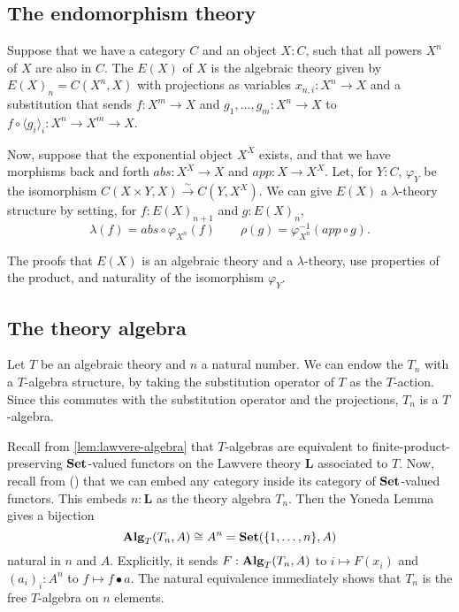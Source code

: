 \subsection{The endomorphism theory}

\begin{definition}\label{def:endomorphism-theory}
  Suppose that we have a category $ C $ and an object $ X: C $, such that all powers $ X^n $ of $ X $ are also in $ C $.
  The  $ E(X) $ of $ X $ is the algebraic theory given by $ E(X)_n = C(X^n, X) $ with projections as variables $ x_{n, i}: X^n \to X $ and a substitution that sends $ f: X^m \to X $ and $ g_1, \dots, g_m: X^n \to X $ to $ f \circ \langle g_i \rangle_i: X^n \to X^m \to X $.
\end{definition}

\begin{definition}
  Now, suppose that the exponential object $ X^X $ exists, and that we have morphisms back and forth $ abs: X^X \to X $ and $ app: X \to X^X $. Let, for $ Y: C $, $ \varphi_Y $ be the isomorphism $ C(X \times Y, X) \xrightarrow{\sim} C(Y, X^X) $.
  We can give $ E(X) $ a $ \lambda $-theory structure by setting, for $ f: E(X)_{n + 1} $ and $ g: E(X)_n $,
  \[ \lambda(f) = abs \circ \varphi_{X^n}(f) \qquad \rho(g) = \varphi_{X^n}^{-1}(app \circ g). \]
\end{definition}

The proofs that $ E(X) $ is an algebraic theory and a $ \lambda $-theory, use properties of the product, and naturality of the isomorphism $ \varphi_Y $.

\subsection{The theory algebra}
\begin{example}
  Let $ T $ be an algebraic theory and $ n $ a natural number. We can endow the $ T_n $ with a $ T $-algebra structure, by taking the substitution operator of $ T $ as the $ T $-action. Since this commutes with the substitution operator and the projections, $ T_n $ is a $ T $-algebra.
\end{example}

\begin{remark}
  Recall from \ref{lem:lawvere-algebra} that $ T $-algebras are equivalent to finite-product-preserving $ \mathbf{Set} $-valued functors on the Lawvere theory $ \mathbf L $ associated to $ T $. Now, recall from (\TODO) that we can embed any category inside its category of $ \mathbf{Set} $-valued functors. This embeds $ n: \mathbf L $ as the theory algebra $ T_n $. Then the Yoneda Lemma gives a bijection
  \[ \mathbf{Alg}_{T}(T_n, A) \cong A^n = \mathbf{Set}(\{ 1, \dots, n \}, A) \]
  natural in $ n $ and $ A $. Explicitly, it sends $ F: \mathbf{Alg}_{T}(T_n, A) $ to $ i \mapsto F(x_i) $ and $ (a_i)_i : A^n $ to $ f \mapsto f \bullet a $. The natural equivalence immediately shows that $ T_n $ is the free $ T $-algebra on $ n $ elements.
\end{remark}

